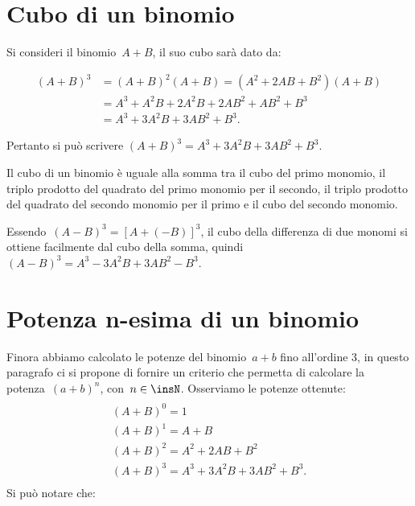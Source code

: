 \ovalbox{\risolvii \ref{ese:11.16}, \ref{ese:11.17}, \ref{ese:11.18}, \ref{ese:11.19}, \ref{ese:11.20}, \ref{ese:11.21}, \ref{ese:11.22}, \ref{ese:11.23}}

\section{Cubo di un binomio}\label{sect:cubo_di_un_binomio}

Si consideri il binomio~$A+B$, il suo cubo sarà dato da:

\begin{align*}
\left(A+B\right)^{3}&=\left(A+B\right)^{2}\left(A+B\right)=\left(A^{2}+2{AB}+B^{2}\right)\left(A+B\right)\\
&=A^{3}+A^{2}B+2A^{2}B+2{AB}^{2}+{AB}^{2}+B^{3}\\
&=A^{3}+3A^{2}B+3{AB}^{2}+B^{3}.
\end{align*}

Pertanto si può scrivere
$\left(A+B\right)^{3}=A^{3}+3A^{2}B+3{AB}^{2}+B^{3}$.

\osservazione Il cubo di un binomio è uguale alla somma tra il
cubo del primo monomio, il triplo prodotto del quadrato del primo
monomio per il secondo, il triplo prodotto del quadrato del secondo
monomio per il primo e il cubo del secondo monomio.

Essendo~$\left(A-B\right)^{3}=\left[A+\left(-B\right)\right]^{3}$, il
cubo della differenza di due monomi si ottiene facilmente dal cubo
della somma, quindi
$\left(A-B\right)^{3}=A^{3}-3A^{2}B+3{AB}^{2}-B^{3}$.

\vspazio\ovalbox{\risolvii \ref{ese:11.24}, \ref{ese:11.25}, \ref{ese:11.26}, \ref{ese:11.27}}

\section{Potenza n-esima di un binomio}

Finora abbiamo calcolato le potenze del binomio~$a+b$ fino
all'ordine 3, in questo paragrafo ci si propone di
fornire un criterio che permetta di calcolare la potenza~$(a+b)^{n}$,
con~$n\in \insN$. Osserviamo le potenze ottenute:
\begin{multline*}
\\(A+B)^{0}=1\\
(A+B)^{1}=A+B\\
(A+B)^{2}=A^{2}+2AB+B^{2}\\
(A+B)^{3}=A^{3}+3A^{2}B+3AB^{2}+B^{3}.\\
\end{multline*}
Si può notare che:

